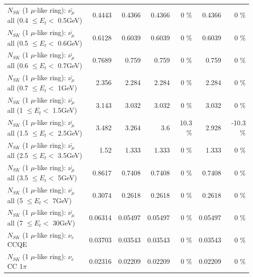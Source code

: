 \begin{table}
\begin{tabular}{| l | r | r | r  r | r  r |}
 $N_{SK}$ (1 $\mu$-like ring): $\bar{\nu_{\mu}}$ all (0.4 $\leq E_{t} <$ 0.5GeV) &          0.4443 &          0.4366 &          0.4366 &        0 \%  &          0.4366 &        0 \%  \\ 
 $N_{SK}$ (1 $\mu$-like ring): $\bar{\nu_{\mu}}$ all (0.5 $\leq E_{t} <$ 0.6GeV) &          0.6128 &          0.6039 &          0.6039 &        0 \%  &          0.6039 &        0 \%  \\ 
 $N_{SK}$ (1 $\mu$-like ring): $\bar{\nu_{\mu}}$ all (0.6 $\leq E_{t} <$ 0.7GeV) &          0.7689 &           0.759 &           0.759 &        0 \%  &           0.759 &        0 \%  \\ 
   $N_{SK}$ (1 $\mu$-like ring): $\bar{\nu_{\mu}}$ all (0.7 $\leq E_{t} <$ 1GeV) &           2.356 &           2.284 &           2.284 &        0 \%  &           2.284 &        0 \%  \\ 
   $N_{SK}$ (1 $\mu$-like ring): $\bar{\nu_{\mu}}$ all (1 $\leq E_{t} <$ 1.5GeV) &           3.143 &           3.032 &           3.032 &        0 \%  &           3.032 &        0 \%  \\ 
 $N_{SK}$ (1 $\mu$-like ring): $\bar{\nu_{\mu}}$ all (1.5 $\leq E_{t} <$ 2.5GeV) &           3.482 &           3.264 &             3.6 &     10.3 \%  &           2.928 &    -10.3 \%  \\ 
 $N_{SK}$ (1 $\mu$-like ring): $\bar{\nu_{\mu}}$ all (2.5 $\leq E_{t} <$ 3.5GeV) &            1.52 &           1.333 &           1.333 &        0 \%  &           1.333 &        0 \%  \\ 
   $N_{SK}$ (1 $\mu$-like ring): $\bar{\nu_{\mu}}$ all (3.5 $\leq E_{t} <$ 5GeV) &          0.8617 &          0.7408 &          0.7408 &        0 \%  &          0.7408 &        0 \%  \\ 
     $N_{SK}$ (1 $\mu$-like ring): $\bar{\nu_{\mu}}$ all (5 $\leq E_{t} <$ 7GeV) &          0.3074 &          0.2618 &          0.2618 &        0 \%  &          0.2618 &        0 \%  \\ 
    $N_{SK}$ (1 $\mu$-like ring): $\bar{\nu_{\mu}}$ all (7 $\leq E_{t} <$ 30GeV) &         0.06314 &         0.05497 &         0.05497 &        0 \%  &         0.05497 &        0 \%  \\ 
\hline
\hline
\hline
                                      $N_{SK}$ (1 $\mu$-like ring): $\nu_e$ CCQE &         0.03703 &         0.03543 &         0.03543 &        0 \%  &         0.03543 &        0 \%  \\ 
                                 $N_{SK}$ (1 $\mu$-like ring): $\nu_e$ CC 1$\pi$ &         0.02316 &         0.02209 &         0.02209 &        0 \%  &         0.02209 &        0 \%  \\ 

\end{tabular}
\end{table}
